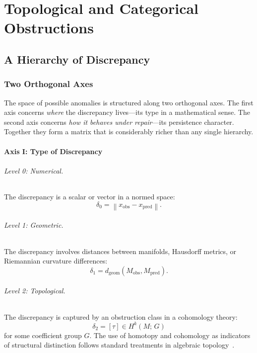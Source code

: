 \documentclass[12pt,oneside]{book}
\theoremstyle{plain}
\theoremstyle{definition}
\theoremstyle{remark}
\newcommand{\norm}[1]{\left\lVert #1 \right\rVert}
\newcommand{\1}{\mathbf{1}}
\begin{document}
\part{Topological and Categorical Obstructions}

\chapter{A Hierarchy of Discrepancy}

\section{Two Orthogonal Axes}

The space of possible anomalies is structured along two orthogonal axes. The first axis concerns \emph{where} the discrepancy lives---its type in a mathematical sense. The second axis concerns \emph{how it behaves under repair}---its persistence character. Together they form a matrix that is considerably richer than any single hierarchy.

\subsection{Axis I: Type of Discrepancy}

\paragraph{Level 0: Numerical.}
The discrepancy is a scalar or vector in a normed space:
\[
\delta_0 = \norm{x_{\mathrm{obs}} - x_{\mathrm{pred}}}.
\]

\paragraph{Level 1: Geometric.}
The discrepancy involves distances between manifolds, Hausdorff metrics, or Riemannian curvature differences:
\[
\delta_1 = d_{\mathrm{geom}}(M_{\mathrm{obs}}, M_{\mathrm{pred}}).
\]

\paragraph{Level 2: Topological.}
The discrepancy is captured by an obstruction class in a cohomology theory:
\[
\delta_2 = [\tau] \in H^k(M;\, G)
\]
for some coefficient group $G$. The use of homotopy and cohomology as indicators of structural distinction follows standard treatments in algebraic topology~\cite{hatcher2002,bott1982}.
\end{document}
